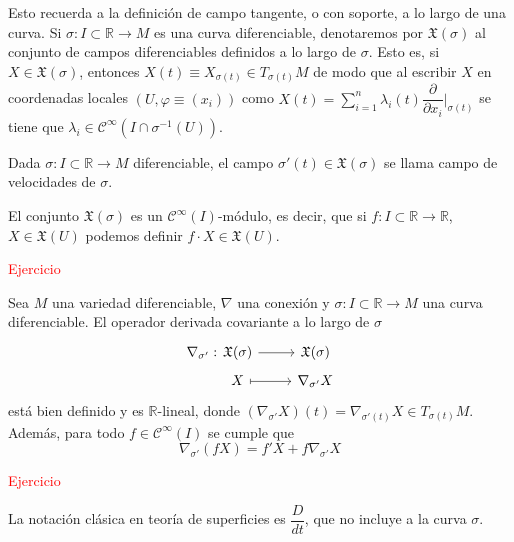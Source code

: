 Esto recuerda a la definición de campo tangente, o con soporte, a lo largo de una curva. Si $\sigma: I \subset \mathbb{R} \to M$  es una curva diferenciable, denotaremos por $\mathfrak X(\sigma)$ al conjunto de campos diferenciables definidos a lo largo de $\sigma$. Esto es, si $X \in \mathfrak X(\sigma)$, entonces $X(t) \equiv X_{\sigma(t)} \in T_{\sigma(t)}M$ de modo que al escribir $X$ en coordenadas locales $(U, \varphi\equiv (x_i))$ como $\displaystyle X(t) = \sum_{i=1}^n \lambda_i(t) \dfrac{\partial}{\partial x_i}\Big|_{\sigma(t)}$ se tiene que $\lambda_i \in \mathcal{C}^{\infty}(I\cap \sigma^{-1}(U))$.
\begin{ejem}
    Dada $\sigma: I \subset \mathbb R \to M$ diferenciable, el campo $\sigma'(t) \in \mathfrak X(\sigma)$ se llama campo de velocidades de $\sigma$.
\end{ejem}
\begin{prop}
    El conjunto $\mathfrak X(\sigma)$ es un $\mathcal{C}^{\infty}(I)$-módulo, es decir, que si $f: I \subset \mathbb R \longrightarrow \mathbb R$, $X\in \mathfrak X(U)$ podemos definir $f\cdot X \in \mathfrak X(U)$.
\end{prop}
\begin{dem}
    \textcolor{red}{Ejercicio}
\end{dem}

\begin{prop}
    Sea $M$ una variedad diferenciable, $\nabla$ una conexión y $\sigma: I\subset \mathbb R \to M$ una curva diferenciable. El operador derivada covariante a lo largo de $\sigma$ $$\begin{tikzcd}
    \nabla_{\sigma'}: \hspace{-10mm} & \mathfrak X(\sigma) \rar & \mathfrak X(\sigma)\\[-5mm]
    & X \arrow[mapsto]{r} & \nabla_{\sigma'} X
    \end{tikzcd}$$ está bien definido y es $\mathbb R$-lineal, donde $(\nabla_{\sigma'} X)(t) = \nabla_{\sigma'(t)} X \in T_{\sigma(t)}M$. Además, para todo $f \in \mathcal{C}^{\infty}(I)$ se cumple que $$\nabla_{\sigma'}(fX) = f' X + f\nabla_{\sigma'} X$$
\end{prop}
\begin{dem}
    \textcolor{red}{Ejercicio}
\end{dem}
\begin{obs}
    La notación clásica en teoría de superficies es $\dfrac{D}{dt}$, que no incluye a la curva $\sigma$.
\end{obs}



